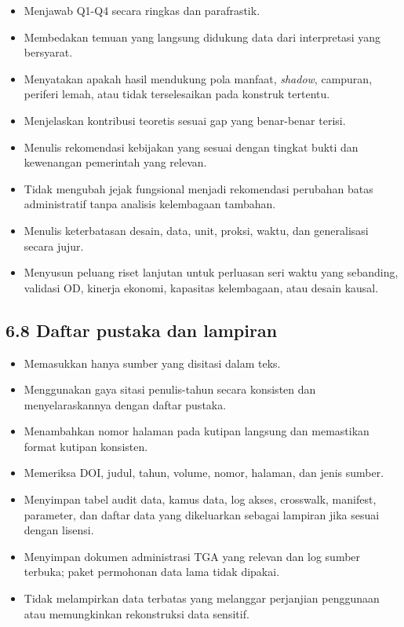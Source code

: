 \documentclass[
  indonesian,
  11pt,
]{article}
\providecommand{\tightlist}{%
  \setlength{\itemsep}{0pt}\setlength{\parskip}{0pt}}
\renewcommand{\tightlist}{%
  \setlength{\itemsep}{0.22em}%
  \setlength{\parskip}{0pt}%
}
\begin{document}
\begin{itemize}
\tightlist
\item[$\square$]
  Menjawab Q1-Q4 secara ringkas dan parafrastik.
\item[$\square$]
  Membedakan temuan yang langsung didukung data dari interpretasi yang
  bersyarat.
\item[$\square$]
  Menyatakan apakah hasil mendukung pola manfaat, \emph{shadow},
  campuran, periferi lemah, atau tidak terselesaikan pada konstruk
  tertentu.
\item[$\square$]
  Menjelaskan kontribusi teoretis sesuai gap yang benar-benar terisi.
\item[$\square$]
  Menulis rekomendasi kebijakan yang sesuai dengan tingkat bukti dan
  kewenangan pemerintah yang relevan.
\item[$\square$]
  Tidak mengubah jejak fungsional menjadi rekomendasi perubahan batas
  administratif tanpa analisis kelembagaan tambahan.
\item[$\square$]
  Menulis keterbatasan desain, data, unit, proksi, waktu, dan
  generalisasi secara jujur.
\item[$\square$]
  Menyusun peluang riset lanjutan untuk perluasan seri waktu yang
  sebanding, validasi OD, kinerja ekonomi, kapasitas kelembagaan, atau
  desain kausal.
\end{itemize}

\subsection{6.8 Daftar pustaka dan
lampiran}\label{daftar-pustaka-dan-lampiran}

\begin{itemize}
\tightlist
\item[$\square$]
  Memasukkan hanya sumber yang disitasi dalam teks.
\item[$\square$]
  Menggunakan gaya sitasi penulis-tahun secara konsisten dan
  menyelaraskannya dengan daftar pustaka.
\item[$\square$]
  Menambahkan nomor halaman pada kutipan langsung dan memastikan format
  kutipan konsisten.
\item[$\square$]
  Memeriksa DOI, judul, tahun, volume, nomor, halaman, dan jenis sumber.
\item[$\square$]
  Menyimpan tabel audit data, kamus data, log akses, crosswalk,
  manifest, parameter, dan daftar data yang dikeluarkan sebagai lampiran
  jika sesuai dengan lisensi.
\item[$\square$]
  Menyimpan dokumen administrasi TGA yang relevan dan log sumber
  terbuka; paket permohonan data lama tidak dipakai.
\item[$\square$]
  Tidak melampirkan data terbatas yang melanggar perjanjian penggunaan
  atau memungkinkan rekonstruksi data sensitif.
\end{itemize}
\end{document}
